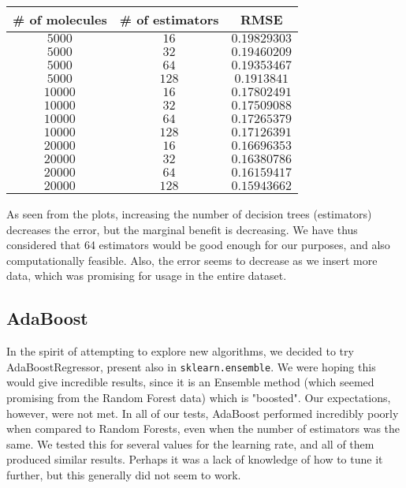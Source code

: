 \documentclass[10pt]{article}
\begin{document}
\begin{center}

\begin{tabular}[center]{|c|c|c|}
\hline
\# of molecules & \# of estimators & RMSE \\
\hline
$5000$ & $16$ & $0.19829303$ \\
\hline 
$5000$ & $32$ & $0.19460209$ \\
\hline 
$5000$ & $64$ & $0.19353467$ \\
\hline 
$5000$ & $128$ & $0.1913841$ \\
\hline 
$10000$ & $16$ & $0.17802491$ \\
\hline 
$10000$ & $32$ & $0.17509088$ \\
\hline 
$10000$ & $64$ & $0.17265379$ \\
\hline
$10000$ & $128$ & $0.17126391$ \\
\hline
$20000$ & $16$ & $0.16696353$ \\
\hline 
$20000$ & $32$ & $0.16380786$ \\
\hline 
$20000$ & $64$ & $0.16159417$ \\
\hline
$20000$ & $128$ & $0.15943662$ \\
\hline
\end{tabular}

\end{center}

\medskip

As seen from the plots, increasing the number of decision trees (estimators)
decreases the error, but the marginal benefit is decreasing. We have thus
considered that 64 estimators would be good enough for our purposes,
and also computationally feasible. Also, the error seems to decrease as we
insert more data, which was promising for usage in the entire dataset.

\subsection{AdaBoost}

In the spirit of attempting to explore new algorithms, we decided to try
AdaBoostRegressor, present also in \verb|sklearn.ensemble|. We were hoping
this would give incredible results, since it is an Ensemble method (which
seemed promising from the Random Forest data) which is "boosted". Our expectations,
however, were not met. In all of our tests, AdaBoost performed incredibly poorly
when compared to Random Forests, even when the number of estimators was the same.
We tested this for several values for the learning rate, and all of them
produced similar results. Perhaps it was a lack of knowledge of how to tune
it further, but this generally did not seem to work.
\end{document}
